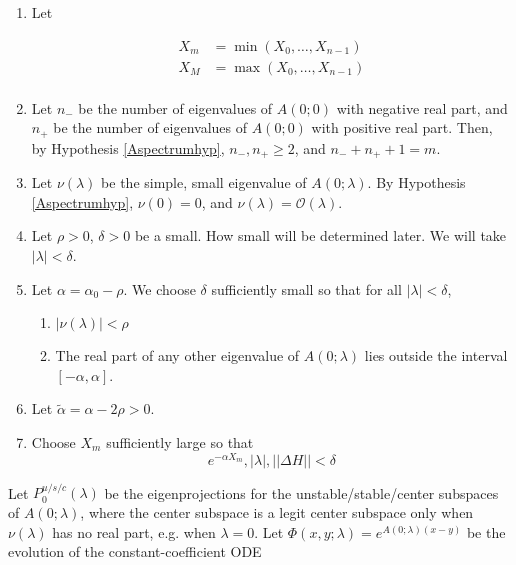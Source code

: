 \documentclass[12pt]{article}
\begin{document}
\begin{enumerate}
	\item Let

	\begin{align*}
	X_m &= \min(X_0, \dots, X_{n-1}) \\
	X_M &= \max(X_0, \dots, X_{n-1}) \\
	\end{align*}

	\item Let $n_-$ be the number of eigenvalues of $A(0; 0)$ with negative real part, and $n_+$ be the number of eigenvalues of $A(0; 0)$ with positive real part. Then, by Hypothesis \ref{Aspectrumhyp}, $n_-, n_+ \geq 2$, and $n_- + n_+ + 1 = m$.

	\item Let $\nu(\lambda)$ be the simple, small eigenvalue of $A(0; \lambda)$. By Hypothesis \ref{Aspectrumhyp}, $\nu(0) = 0$, and $\nu(\lambda) = \mathcal{O}(\lambda)$. 

	\item Let $\rho > 0$, $\delta > 0$ be a small. How small will be determined later. We will take $|\lambda| < \delta$.

	\item Let $\alpha = \alpha_0 - \rho$. We choose $\delta$ sufficiently small so that for all $|\lambda| < \delta$,

	\begin{enumerate}
		\item $|\nu(\lambda)| < \rho$
		\item The real part of any other eigenvalue of $A(0; \lambda)$ lies outside the interval $[-\alpha, \alpha]$.
	\end{enumerate}

	\item Let $\tilde{\alpha} = \alpha - 2 \rho > 0$.

	\item Choose $X_m$ sufficiently large so that
	\begin{equation}
	e^{-\alpha X_m}, |\lambda|, ||\Delta H|| < \delta
	\end{equation}

\end{enumerate}

Let $P^{u/s/c}_0(\lambda)$ be the eigenprojections for the unstable/stable/center subspaces of $A(0; \lambda)$, where the center subspace is a legit center subspace only when $\nu(\lambda)$ has no real part, e.g. when $\lambda = 0$. Let $\Phi(x, y; \lambda) = e^{A(0; \lambda)(x-y)}$ be the evolution of the constant-coefficient ODE
\end{document}

